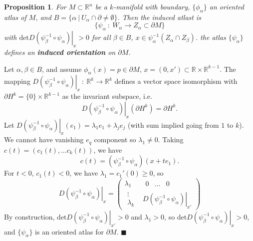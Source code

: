 \documentclass[letter-paper]{tufte-book}
\newtheorem{proposition}[theorem]{\color{pastel-blue}Proposition}
\newenvironment{proof}[1][Proof]{\begin{trivlist}
\item[\hskip \labelsep {\bfseries #1}]}{\end{trivlist}}
\newcommand{\qed}{\hfill$\blacksquare$}
\begin{document}
\begin{proposition}
  For $M \subset \mathbb{R}^n$ be a $k$-manifold with boundary, $\{\phi_\alpha\}$ an oriented atlas of $M$, and $B = \{\alpha\ |\ U_\alpha \cap \partial \neq \emptyset\}$. Then the induced atlast is
  \begin{equation*}
    \{\psi_\alpha\ :\ W_\alpha \to Z_\alpha \subset \partial M\}
  \end{equation*}
  with $\mbox{det}\left.D(\psi_\beta^{-1} \circ \psi_\alpha)\right|_x > 0$ for all $\beta \in B$, $x \in \psi_\alpha^{-1}(Z_\alpha \cap Z_\beta)$. the atlas $\{\psi_\alpha\}$ defines an \textbf{induced orientation} on $\partial M$.
\end{proposition}

\begin{proof}
  Let $\alpha, \beta \in B$, and assume $\phi_\alpha(x) = p \in \partial M$, $x=(0, x') \subset \mathbb{R} \times \mathbb{R}^{k-1}$. The mapping $ \left.D(\psi_\beta^{-1} \circ \psi_\alpha)\right|_x\ :\ \mathbb{R}^k\to\mathbb{R}^k$ defines a vector space isomorphism with $\partial H^k = \{0\} \times \mathbb{R}^{k-1}$ as the invariant subspace, i.e.
  \begin{equation*}
    \left.D(\psi_\beta^{-1} \circ \psi_\alpha)\right|_x(\partial H^k) = \partial H^k.
  \end{equation*}
  Let $\left.D(\psi_\beta^{-1} \circ \psi_\alpha)\right|_x(e_1) = \lambda_1 e_1 + \lambda_j e_j$ (with sum implied going from $1$ to $k$). We cannot have vanishing $e_q$ component so $\lambda_1 \neq 0$. Taking $c(t) = (c_1(t), \ldots c_k(t))$, we have
  \begin{equation*}
    c(t) = (\psi_\beta^{-1} \circ \psi_\alpha) (x + te_1).
  \end{equation*}
  For $t < 0$, $c_1(t) < 0$, we have $\lambda_1 = c_1'(0) \geq 0$, so
  \begin{equation*}
    \left.D(\psi_\beta^{-1} \circ \psi_\alpha)\right|_x = \begin{pmatrix} \lambda_1 & \begin{matrix} 0 & \ldots & 0\end{matrix} \\ \begin{matrix} \vdots \\ \lambda_k \end{matrix} & \left.D(\psi_\beta^{-1} \circ \psi_\alpha)\right|_{x'} \end{pmatrix}
  \end{equation*}
  By construction, $\mbox{det}\left.D(\psi_\beta^{-1} \circ \psi_\alpha)\right|_{x'} > 0$ and $\lambda_1 > 0$, so $\mbox{det}\left.D(\psi_\beta^{-1} \circ \psi_\alpha)\right|_x > 0$, and $\{\psi_\alpha\}$ is an oriented atlas for $\partial M$. \qed
\end{proof}
\end{document}
